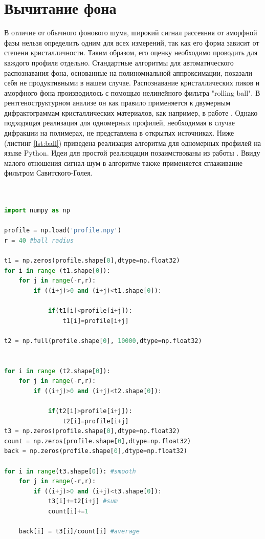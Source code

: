 	\section{Вычитание фона}
	
	В отличие от обычного фонового шума, широкий сигнал рассеяния от аморфной фазы нельзя определить одним для всех измерений, так как его форма зависит от степени кристалличности. Таким образом, его оценку необходимо проводить для каждого профиля отдельно.
	Стандартные алгоритмы для автоматического распознавания фона, основанные на полиномиальной аппроксимации, показали себя не продуктивными в нашем случае. Распознавание кристаллических пиков и аморфного фона производилось с помощью нелинейного фильтра "rolling ball". В рентгеноструктурном анализе он как правило применяется к двумерным дифрактограммам кристаллических материалов, как например, в работе \cite{ball2018}. Однако подходящая реализация для одномерных профилей, необходимая в случае дифракции на полимерах, не представлена в открытых источниках. Ниже (листинг \ref{lst:ball}) приведена реализация алгоритма для одномерных профилей на языке Python. 
	Идеи для простой реализцации позаимствованы из работы \cite{ball-code}. Ввиду малого отношения сигнал-шум в алгоритме также применяется сглаживание фильтром Савитского-Голея.
\vspace{5px}
	\begin{lstlisting}[language=Python, caption=Алгоритм распознавания фона, label={lst:ball}]
	

import numpy as np
 
profile = np.load('profile.npy')
r = 40 #ball radius

t1 = np.zeros(profile.shape[0],dtype=np.float32)
for i in range (t1.shape[0]):
    for j in range(-r,r):
        if ((i+j)>0 and (i+j)<t1.shape[0]):
            
            if(t1[i]<profile[i+j]):
                t1[i]=profile[i+j]
                
t2 = np.full(profile.shape[0], 10000,dtype=np.float32)


for i in range (t2.shape[0]):
    for j in range(-r,r):
        if ((i+j)>0 and (i+j)<t2.shape[0]):
            
            if(t2[i]>profile[i+j]):
                t2[i]=profile[i+j]
t3 = np.zeros(profile.shape[0],dtype=np.float32)
count = np.zeros(profile.shape[0],dtype=np.float32)
back = np.zeros(profile.shape[0],dtype=np.float32)

for i in range(t3.shape[0]): #smooth
    for j in range(-r,r):
        if ((i+j)>0 and (i+j)<t3.shape[0]):
            t3[i]+=t2[i+j] #sum
            count[i]+=1
            
    back[i] = t3[i]/count[i] #average
\end{lstlisting}
\vspace{5px}


